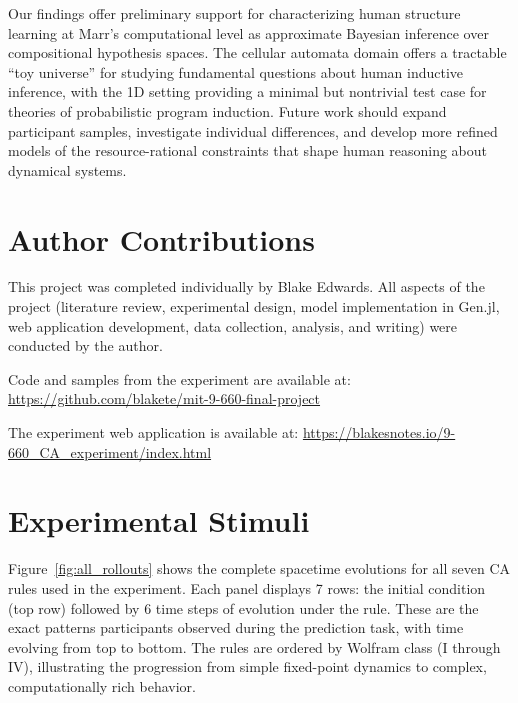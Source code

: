 \documentclass[10pt,letterpaper]{article}
\begin{document}
Our findings offer preliminary support for characterizing human structure learning at Marr's computational level as approximate Bayesian inference over compositional hypothesis spaces. The cellular automata domain offers a tractable ``toy universe'' for studying fundamental questions about human inductive inference, with the 1D setting providing a minimal but nontrivial test case for theories of probabilistic program induction. Future work should expand participant samples, investigate individual differences, and develop more refined models of the resource-rational constraints that shape human reasoning about dynamical systems.


\section{Author Contributions}

This project was completed individually by Blake Edwards. All aspects of the project (literature review, experimental design, model implementation in Gen.jl, web application development, data collection, analysis, and writing) were conducted by the author.

Code and samples from the experiment are available at: \url{https://github.com/blakete/mit-9-660-final-project}

The experiment web application is available at: \url{https://blakesnotes.io/9-660_CA_experiment/index.html}





\setlength{\bibleftmargin}{.125in}
\setlength{\bibindent}{-\bibleftmargin}



\newpage
\appendix
\section{Experimental Stimuli}

Figure~\ref{fig:all_rollouts} shows the complete spacetime evolutions for all seven CA rules used in the experiment. Each panel displays 7 rows: the initial condition (top row) followed by 6 time steps of evolution under the rule. These are the exact patterns participants observed during the prediction task, with time evolving from top to bottom. The rules are ordered by Wolfram class (I through IV), illustrating the progression from simple fixed-point dynamics to complex, computationally rich behavior.
\end{document}

